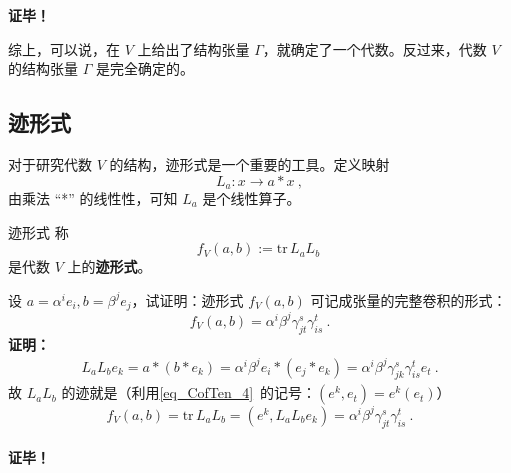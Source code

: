 \textbf{证毕！}

综上，可以说，在 $V$ 上给出了结构张量 $\Gamma$，就确定了一个代数。反过来，代数 $V$ 的结构张量 $\Gamma$ 是完全确定的。
\subsection{迹形式}
对于研究代数 $V$ 的结构，迹形式是一个重要的工具。定义映射
\begin{equation}
L_a:x\rightarrow a*x~,
\end{equation}
由乘法 “*” 的线性性，可知 $L_a$ 是个线性算子。
\begin{definition}{迹形式}
称
\begin{equation}
f_V(a,b):=\mathrm{tr}\, L_aL_b~
\end{equation}
是代数 $V$ 上的\textbf{迹形式}。
\end{definition}
\begin{example}{}\label{ex_STAlg_1}
设 $a=\alpha^i e_i,b=\beta^j e_j$，试证明：迹形式 $f_V(a,b)$ 可记成张量的完整卷积的形式：
\begin{equation}
f_V(a,b)=\alpha^i\beta^j\gamma_{jt}^s\gamma_{is}^t~.
\end{equation}
\textbf{证明：}
\begin{equation}
\begin{aligned}
L_aL_b e_k=a*(b*e_k)=\alpha^i\beta^je_i*(e_j*e_k)=\alpha^i\beta^j\gamma_{jk}^s \gamma_{is}^t e_t~.
\end{aligned}
\end{equation}
故 $L_aL_b$ 的迹就是（利用\autoref{eq_CofTen_4}~的记号：$(e^k,e_t)=e^k(e_t)$）
\begin{equation}
f_V(a,b)=\mathrm{tr}\, L_a L_b=(e^k,L_aL_b e_k)=\alpha^i\beta^j\gamma_{jt}^s \gamma_{is}^t~.
\end{equation}\\
\textbf{证毕！}
\end{example}

